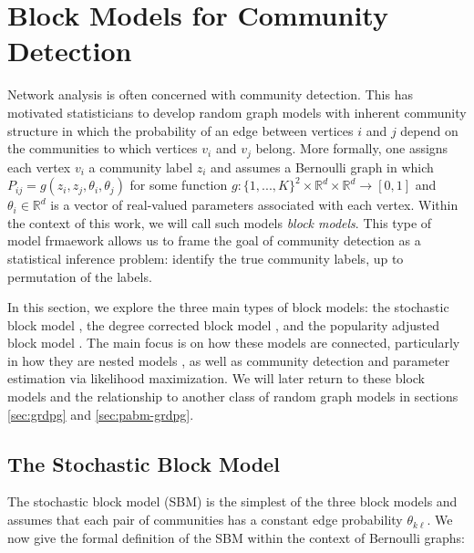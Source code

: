 \documentclass[
  11pt,
]{article}
\theoremstyle{definition}
\theoremstyle{definition}
\theoremstyle{definition}
\theoremstyle{definition}
\theoremstyle{remark}
\begin{document}
\newpage

\hypertarget{sec:blockmodel}{%
\section{Block Models for Community Detection}\label{sec:blockmodel}}

Network analysis is often concerned with community detection.
This has motivated statisticians to develop random graph models with inherent community structure in which the probability of an edge between vertices \(i\) and \(j\) depend on the communities to which vertices \(v_i\) and \(v_j\) belong.
More formally, one assigns each vertex \(v_i\) a community label \(z_i\) and assumes a Bernoulli graph in which \(P_{ij} = g(z_i, z_j, \theta_i, \theta_j)\) for some function \(g: \{1, ..., K\}^2 \times \mathbb{R}^d \times \mathbb{R}^d \to [0, 1]\) and \(\theta_i \in \mathbb{R}^d\) is a vector of real-valued parameters associated with each vertex.
Within the context of this work, we will call such models \emph{block models}.
This type of model frmaework allows us to frame the goal of community detection as a statistical inference problem:
identify the true community labels, up to permutation of the labels.

In this section, we explore the three main types of block models:
the stochastic block model \citep{doi:10.1080/0022250X.1971.9989788}, the degree corrected block model \citep{Karrer_2011}, and the popularity adjusted block model \citep{307cbeb9b1be48299388437423d94bf1}.
The main focus is on how these models are connected, particularly in how they are nested models \citep{Noroozi2022}, as well as community detection and parameter estimation via likelihood maximization.
We will later return to these block models and the relationship to another class of random graph models in sections \ref{sec:grdpg} and \ref{sec:pabm-grdpg}.

\hypertarget{sec:sbm}{%
\subsection{The Stochastic Block Model}\label{sec:sbm}}

The stochastic block model (SBM) \citep{doi:10.1080/0022250X.1971.9989788} is the simplest of the three block models and assumes that each pair of communities has a constant edge probability \(\theta_{k \ell}\).
We now give the formal definition of the SBM within the context of Bernoulli graphs:
\end{document}

